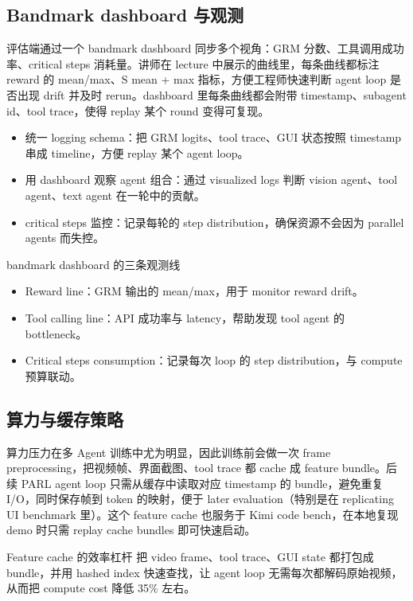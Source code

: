 \documentclass[a4paper]{article}
\begin{document}
\subsection{Bandmark dashboard 与观测}
评估端通过一个 bandmark dashboard 同步多个视角：GRM 分数、工具调用成功率、critical steps 消耗量。讲师在 lecture 中展示的曲线里，每条曲线都标注 reward 的 mean/max、S mean + max 指标，方便工程师快速判断 agent loop 是否出现 drift 并及时 rerun。dashboard 里每条曲线都会附带 timestamp、subagent id、tool trace，使得 replay 某个 round 变得可复现。
\begin{itemize}
    \item 统一 logging schema：把 GRM logits、tool trace、GUI 状态按照 timestamp 串成 timeline，方便 replay 某个 agent loop。
    \item 用 dashboard 观察 agent 组合：通过 visualized logs 判断 vision agent、tool agent、text agent 在一轮中的贡献。
    \item critical steps 监控：记录每轮的 step distribution，确保资源不会因为 parallel agents 而失控。
\end{itemize}

\begin{knowledgebox}{bandmark dashboard 的三条观测线}
\begin{itemize}
    \item Reward line：GRM 输出的 mean/max，用于 monitor reward drift。
    \item Tool calling line：API 成功率与 latency，帮助发现 tool agent 的 bottleneck。
    \item Critical steps consumption：记录每次 loop 的 step distribution，与 compute 预算联动。
\end{itemize}
\end{knowledgebox}

\subsection{算力与缓存策略}
算力压力在多 Agent 训练中尤为明显，因此训练前会做一次 frame preprocessing，把视频帧、界面截图、tool trace 都 cache 成 feature bundle。后续 PARL agent loop 只需从缓存中读取对应 timestamp 的 bundle，避免重复 I/O，同时保存帧到 token 的映射，便于 later evaluation（特别是在 replicating UI benchmark 里）。这个 feature cache 也服务于 Kimi code bench，在本地复现 demo 时只需 replay cache bundles 即可快速启动。

\begin{importantbox}{Feature cache 的效率杠杆}
把 video frame、tool trace、GUI state 都打包成 bundle，并用 hashed index 快速查找，让 agent loop 无需每次都解码原始视频，从而把 compute cost 降低 35\% 左右。
\end{importantbox}
\end{document}
